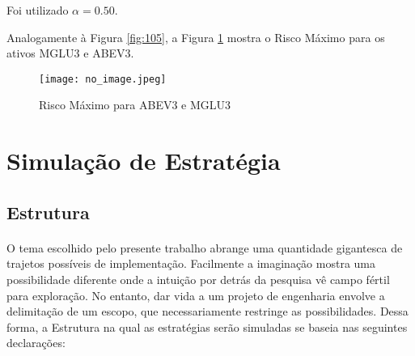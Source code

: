 \begin{itemize}
    Foi utilizado \begin{math} \alpha = 0.50 \end{math}.

    Analogamente à Figura \ref{fig:105}, a Figura \ref{fig:108} mostra o Risco Máximo para os ativos MGLU3 e ABEV3.

    \begin{figure}[h]
        \texttt{[image: no\_image.jpeg]}
        \centering
        \caption{Risco Máximo para ABEV3 e MGLU3}
        \label{fig:108}
    \end{figure}

\end{itemize}



\section{Simulação de Estratégia}

\subsection{Estrutura}

\paragraph{} O tema escolhido pelo presente trabalho abrange uma quantidade gigantesca de trajetos possíveis de implementação. Facilmente a imaginação mostra uma possibilidade diferente onde a intuição por detrás da pesquisa vê campo fértil para exploração. No entanto, dar vida a um projeto de engenharia envolve a delimitação de um escopo, que necessariamente restringe as possibilidades. Dessa forma, a Estrutura na qual as estratégias serão simuladas se baseia nas seguintes declarações:


